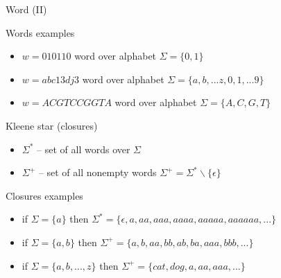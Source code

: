 \documentclass{beamer}
\begin{document}

\begin{frame}{Word (II)}

\begin{exampleblock}{Words examples}
\begin{itemize}
\item $w = 010110$ word over alphabet $\Sigma = \{0, 1\}$
\item $w = abc13dj3$ word over alphabet $\Sigma = \{a, b, ...z, 0, 1, ...9\}$
\item $w = ACGTCCGGTA$ word over alphabet $\Sigma = \{A, C, G, T\}$
\end{itemize}
\end{exampleblock}

\begin{block}{Kleene star (closures)}
\begin{itemize}
\item $\Sigma^{\ast}$ -- set of all words over $\Sigma$
\item $\Sigma^{+}$ -- set of all nonempty words $\Sigma^+=\Sigma^*\backslash\{\epsilon\}$
\end{itemize}
\end{block}

\begin{exampleblock}{Closures examples}
\begin{itemize}
\item if $\Sigma = \{a\}$ then $\Sigma^{\ast} = \{\epsilon, a, aa, aaa, aaaa, aaaaa, aaaaaa, ...\}$
\item if $\Sigma = \{a, b\}$ then $\Sigma^{+} = \{a, b, aa, bb, ab, ba, aaa, bbb, ...\}$
\item if $\Sigma = \{a, b, ..., z\}$ then $\Sigma^{+} = \{cat, dog, a, aa, aaa, ...\}$
\end{itemize}
\end{exampleblock}

\end{frame}

\end{document}
